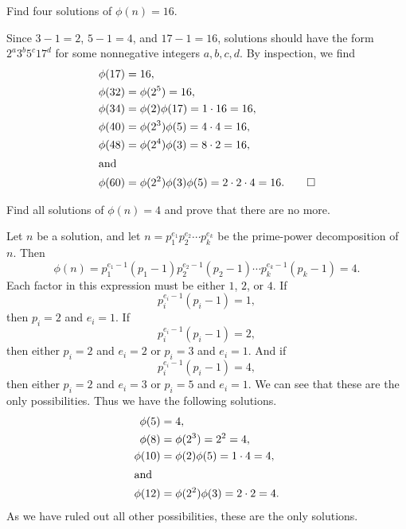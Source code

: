  Find four solutions of $\phi(n) = 16$.
\begin{solution}
  Since $3 - 1 = 2$, $5 - 1 = 4$, and $17 - 1 = 16$, solutions should
  have the form $2^a3^b5^c17^d$ for some nonnegative integers
  $a,b,c,d$. By inspection, we find
  \begin{align*}
    \phi(17) &= 16, \\
    \phi(32) &= \phi(2^5) = 16, \\
    \phi(34) &= \phi(2)\phi(17) = 1\cdot16 = 16, \\
    \phi(40) &= \phi(2^3)\phi(5) = 4\cdot4 = 16, \\
    \phi(48) &= \phi(2^4)\phi(3) = 8\cdot2 = 16, \\
    \intertext{and}
    \phi(60) &= \phi(2^2)\phi(3)\phi(5) = 2\cdot2\cdot4 = 16. \qedhere
  \end{align*}
\end{solution}

 Find all solutions of $\phi(n) = 4$ and prove that there
are no more.
\begin{solution}
  Let $n$ be a solution, and let
  $n = p_1^{e_1}p_2^{e_2}\cdots p_k^{e_k}$ be the prime-power
  decomposition of $n$. Then
  \begin{equation*}
    \phi(n) = p_1^{e_1 - 1}(p_1 - 1)p_2^{e_2 - 1}(p_2 - 1)
    \cdots p_k^{e_k - 1}(p_k - 1) = 4.
  \end{equation*}
  Each factor in this expression must be either $1$, $2$, or $4$. If
  \begin{equation*}
    p_i^{e_i - 1}(p_i - 1) = 1,
  \end{equation*}
  then $p_i = 2$ and $e_i = 1$. If
  \begin{equation*}
    p_i^{e_i - 1}(p_i - 1) = 2,
  \end{equation*}
  then either $p_i = 2$ and $e_i = 2$ or $p_i = 3$ and $e_i = 1$. And
  if
  \begin{equation*}
    p_i^{e_i - 1}(p_i - 1) = 4,
  \end{equation*}
  then either $p_i = 2$ and $e_i = 3$ or $p_i = 5$ and $e_i = 1$. We
  can see that these are the only possibilities. Thus we have the
  following solutions.
  \begin{align*}
    \phi(5) &= 4, \\
    \phi(8) &= \phi(2^3) = 2^2 = 4, \\
    \phi(10) &= \phi(2)\phi(5) = 1\cdot4 = 4, \\
    \intertext{and}
    \phi(12) &= \phi(2^2)\phi(3) = 2\cdot2 = 4.
  \end{align*}
  As we have ruled out all other possibilities, these are the only
  solutions.
\end{solution}

